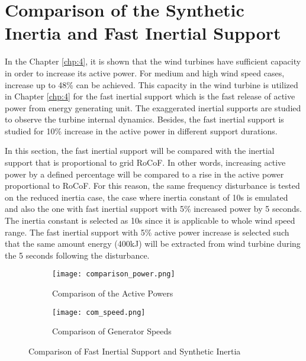 \section{Comparison of the Synthetic Inertia and Fast Inertial Support}
In the Chapter \ref{chp:4}, it is shown that the wind turbines have sufficient capacity in order to increase its active power. For medium and high wind speed cases, increase up to 48\% can be achieved. This capacity in the wind turbine is utilized in Chapter \ref{chp:4} for the fast inertial support which is the fast release of active power from energy generating unit. The exaggerated inertial supports are studied to observe the turbine internal dynamics. Besides, the fast inertial support is studied for 10\% increase in the active power in different support durations.\par
In this section, the fast inertial support will be compared with the inertial support that is proportional to grid RoCoF. In other words, increasing active power by a defined percentage will be compared to a rise in the active power proportional to RoCoF. For this reason, the same frequency disturbance is tested on the reduced inertia case, the case where inertia constant of 10s is emulated and also the one with fast inertial support with 5\% increased power by 5 seconds. The inertia constant is selected as 10s since it is applicable to whole wind speed range. The fast inertial support with 5\% active power increase is selected such that the same amount energy (400kJ) will be extracted from wind turbine during the 5 seconds following the disturbance. \par 
\begin{figure}[h]
	\centering
	\begin{subfigure}{1\textwidth} %
		\centering
		\texttt{[image: comparison\_power.png]}
		\caption{Comparison of the Active Powers}
		\label{Comp_power}
	\end{subfigure}
	\vspace{0.1em} %
	\begin{subfigure}{1\textwidth} %
		\centering	
		\texttt{[image: com\_speed.png]}
		\caption{Comparison of Generator Speeds}		
		\label{Comp_speed}
	\end{subfigure}
	\caption{Comparison of Fast Inertial Support and Synthetic Inertia}	
\end{figure}
